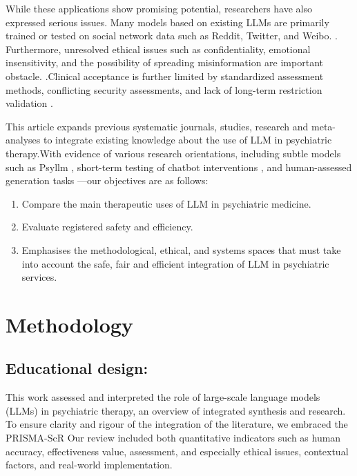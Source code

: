 \documentclass[sn-basic,authoryear]{sn-jnl}
\begin{document}
While these applications show promising potential, researchers have also expressed serious issues. Many models based on existing LLMs are primarily trained or tested on social network data such as Reddit, Twitter, and Weibo. \cite{Volkmer,JMIR2024}. Furthermore, unresolved ethical issues such as confidentiality, emotional insensitivity, and the possibility of spreading misinformation are important obstacle. \cite{Minerva2023,Hodson2024}.Clinical acceptance is further limited by standardized assessment methods, conflicting security assessments, and lack of long-term restriction validation \cite{Zhong2024}.

This article expands previous systematic journals, studies, research and meta-analyses to integrate existing knowledge about the use of LLM in psychiatric therapy.With evidence of various research orientations, including subtle models such as Psyllm  \cite{Hu2025}, short-term testing of chatbot interventions \cite{Zhong2024}, and human-assessed generation tasks \cite{Hua2024b}—our objectives are as follows: 
\begin{enumerate}
    \item Compare the main therapeutic uses of LLM in psychiatric medicine.
    \item Evaluate registered safety and efficiency.
    \item Emphasises the methodological, ethical, and systems spaces that must take into account the safe, fair and efficient integration of LLM in psychiatric services.
\end{enumerate}

\section{Methodology}
\subsection{Educational design:}
This work assessed and interpreted the role of large-scale language models (LLMs) in psychiatric therapy, an overview of integrated synthesis and research. To ensure clarity and rigour of the integration of the literature, we embraced the PRISMA-ScR  \citep{tricco2018prismascr} Our review included both quantitative indicators such as human accuracy, effectiveness value, assessment, and especially ethical issues, contextual factors, and real-world implementation.
\end{document}

